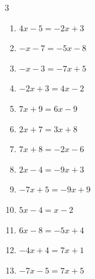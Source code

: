 \begin{multicols}{3}
\begin{enumerate}

  \item $4x-5=-2x+3$


  \item $-x-7=-5x-8$


  \item $-x-3=-7x+5$


  \item $-2x+3=4x-2$


  \item $7x+9=6x-9$

        \phantom{$\displaystyle x=-18$}

  \item $2x+7=3x+8$

        \phantom{$\displaystyle x=-1$}

  \item $7x+8=-2x-6$


  \item $2x-4=-9x+3$


  \item $-7x+5=-9x+9$

        \phantom{$\displaystyle x=2$}

  \item $5x-4=x-2$


\columnbreak %

\resetques

  \item $6x-8=-5x+4$


  \item $-4x+4=7x+1$


  \item $-7x-5=7x+5$



\end{enumerate}
\end{multicols}
